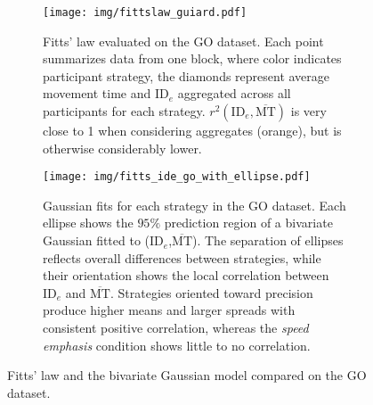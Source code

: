 \documentclass[acmlarge, manuscript,review]{acmart}
\newcommand{\mmt}{\ensuremath{\overline{\mt}}\xspace}
\newcommand{\mt}{\ensuremath{{\text{MT}}}\xspace}
\newcommand{\ide}{\ensuremath{{\text{ID}_e}}\xspace}
\begin{document}
\begin{figure}[htbp]
   \centering
   \begin{subfigure}[t]{0.47\textwidth}
	   \texttt{[image: img/fittslaw\_guiard.pdf]}
	\caption{Fitts' law evaluated on the GO dataset. Each point summarizes data from one block, where color indicates participant strategy, the diamonds represent average movement time and \ide aggregated across all participants for each strategy. $r^2(\ide, \mmt)$ is very close to 1 when considering aggregates (orange), but is otherwise considerably lower.}
	\label{fig:fittslaw_guiard}
   \end{subfigure}
   \hfill
   \begin{subfigure}[t]{0.505\textwidth}
	   \texttt{[image: img/fitts\_ide\_go\_with\_ellipse.pdf]}
	\caption{Gaussian fits for each strategy in the GO dataset. Each ellipse shows the $95\%$ prediction region of a bivariate Gaussian fitted to (\ide,\mmt). The separation of ellipses reflects overall differences between strategies, while their orientation shows the local correlation between \ide and \mmt. Strategies oriented toward precision produce higher means and larger spreads with consistent positive correlation, whereas the \textit{speed emphasis} condition shows little to no correlation.}
	\label{fig:go_ide}
   \end{subfigure}
  
\caption{Fitts' law and the bivariate Gaussian model compared on the GO dataset.}
\label{fig:main}
\end{figure}


\begin{figure}[htbp]
	\centering
	
\end{figure}





\begin{figure}[htbp]
	\centering
	
\end{figure}
\end{document}
